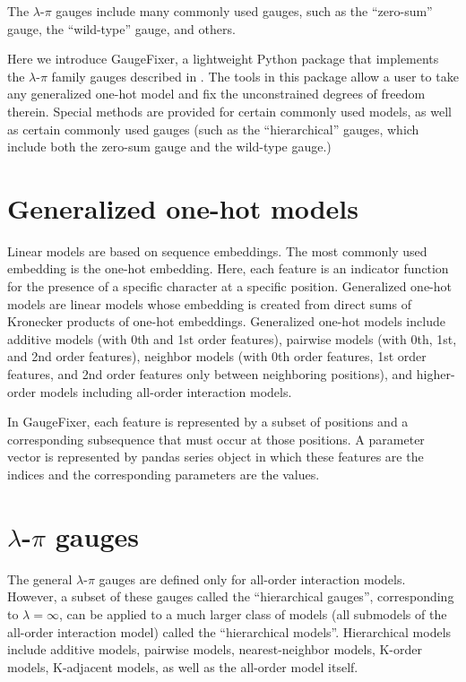 \documentclass[12pt,letterpaper]{article}
\begin{document}
The $\lambda$-$\pi$ gauges include many commonly used gauges, such as the ``zero-sum'' gauge, the ``wild-type'' gauge, and others. 

Here we introduce GaugeFixer, a lightweight Python package that implements the $\lambda$-$\pi$ family gauges described in \cite{ref1}. The tools in this package allow a user to take any generalized one-hot model and fix the unconstrained degrees of freedom therein. Special methods are provided for certain commonly used models, as well as certain commonly used gauges (such as the ``hierarchical'' gauges, which include both the zero-sum gauge and the wild-type gauge.)

\section{Generalized one-hot models}
Linear models are based on sequence embeddings. The most commonly used embedding is the one-hot embedding. Here, each feature is an indicator function for the presence of a specific character at a specific position. Generalized one-hot models are linear models whose embedding is created from direct sums of Kronecker products of one-hot embeddings. Generalized one-hot models include additive models (with 0th and 1st order features), pairwise models (with 0th, 1st, and 2nd order features), neighbor models (with 0th order features, 1st order features, and 2nd order features only between neighboring positions), and higher-order models including all-order interaction models. 

In GaugeFixer, each feature is represented by a subset of positions and a corresponding subsequence that must occur at those positions. A parameter vector is represented by pandas series object in which these features are the indices and the corresponding parameters are the values.



\section{$\lambda$-$\pi$ gauges}
The general $\lambda$-$\pi$ gauges are defined only for all-order interaction models. However, a subset of these gauges called the ``hierarchical gauges'', corresponding to $\lambda = \infty$, can be applied to a much larger class of models (all submodels of the all-order interaction model) called the ``hierarchical models''. Hierarchical models include additive models, pairwise models, nearest-neighbor models, K-order models, K-adjacent models, as well as the all-order model itself. 
\end{document}
